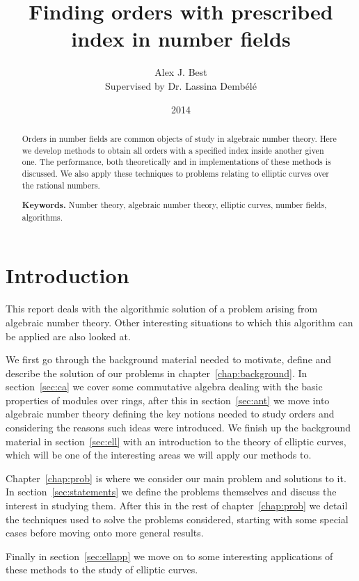 \documentclass[a4paper,abstracton,bibtotoc]{scrreprt}
\author{Alex J. Best \\ Supervised by Dr. Lassina Demb\'el\'e}
\date{2014}
\title{Finding orders with prescribed index in number fields}
\theoremstyle{definition}
\begin{document}
\maketitle

\begin{abstract}
Orders in number fields are common objects of study in algebraic number theory.
Here we develop methods to obtain all orders with a specified index inside another given one.
The performance, both theoretically and in implementations of these methods is discussed.
We also apply these techniques to problems relating to elliptic curves over the rational numbers.

\smallskip
\noindent \textbf{Keywords.} Number theory, algebraic number theory, elliptic curves, number fields, algorithms.
\end{abstract}

\tableofcontents

\chapter{Introduction}
This report deals with the algorithmic solution of a problem arising from algebraic number theory. 
Other interesting situations to which this algorithm can be applied are also looked at.

We first go through the background material needed to motivate, define and describe the solution of our problems in chapter~\ref{chap:background}.
In section~\ref{sec:ca} we cover some commutative algebra dealing with the basic properties of modules over rings, after this in section~\ref{sec:ant} we move into algebraic number theory defining the key notions needed to study orders and considering the reasons such ideas were introduced.
We finish up the background material in section~\ref{sec:ell} with an introduction to the theory of elliptic curves, which will be one of the interesting areas we will apply our methods to.

Chapter~\ref{chap:prob} is where we consider our main problem and solutions to it.
In section~\ref{sec:statements} we define the problems themselves and discuss the interest in studying them.
After this in the rest of chapter~\ref{chap:prob} we detail the techniques used to solve the problems considered, starting with some special cases before moving onto more general results.

Finally in section~\ref{sec:ellapp} we move on to some interesting applications of these methods to the study of elliptic curves.
\end{document}

